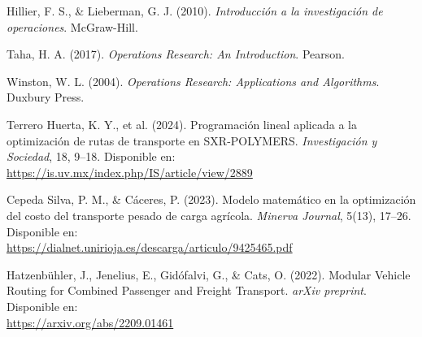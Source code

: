 \documentclass[12pt]{article}
\begin{document}
	\begin{enumerate}[label={[\arabic*]}]
		\item Hillier, F. S., \& Lieberman, G. J. (2010). \textit{Introducción a la investigación de operaciones}. McGraw-Hill.
		\item Taha, H. A. (2017). \textit{Operations Research: An Introduction}. Pearson.
		\item Winston, W. L. (2004). \textit{Operations Research: Applications and Algorithms}. Duxbury Press.
		\item Terrero Huerta, K. Y., et al. (2024). Programación lineal aplicada a la optimización de rutas de transporte en SXR-POLYMERS. \textit{Investigación y Sociedad}, 18, 9–18. Disponible en: \\
		\url{https://is.uv.mx/index.php/IS/article/view/2889}
		\item Cepeda Silva, P. M., \& Cáceres, P. (2023). Modelo matemático en la optimización del costo del transporte pesado de carga agrícola. \textit{Minerva Journal}, 5(13), 17–26. Disponible en: \\
		\url{https://dialnet.unirioja.es/descarga/articulo/9425465.pdf}
		\item Hatzenbühler, J., Jenelius, E., Gidófalvi, G., \& Cats, O. (2022). Modular Vehicle Routing for Combined Passenger and Freight Transport. \textit{arXiv preprint}. Disponible en: \\
		\url{https://arxiv.org/abs/2209.01461}
	\end{enumerate}
	
\end{document}
